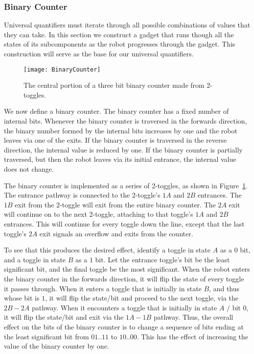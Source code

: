 \subsubsection{Binary Counter}

Universal quantifiers must iterate through all possible combinations of values that they can take. In this section we construct a gadget that runs though all the states of its subcomponents as the robot progresses through the gadget. This construction will serve as the base for our universal quantifiers.

\begin{figure}[h!]
\centering
    \texttt{[image: BinaryCounter]}
    \caption{The central portion of a three bit binary counter made from 2-toggles.}
    \label{fig:BinaryCounter}
\end{figure}
  
We now define a binary counter. The binary counter has a fixed number of internal bits.
Whenever the binary counter is traversed in the forwards direction, the binary number
formed by the internal bits increases by one and the robot leaves via one of the exits.
If the binary counter is traversed in the reverse direction, the internal value is reduced by
one. If the binary counter is partially traversed, but then the robot leaves via its initial entrance,
the internal value does not change.

The binary counter is implemented as a series of 2-toggles, as shown in Figure~\ref{fig:BinaryCounter}.
The entrance pathway is connected to the 2-toggle's $1A$ and $2B$ entrances. The $1B$ exit from the 2-toggle
will exit from the entire binary counter. The $2A$ exit will continue on to the next 2-toggle,
attaching to that toggle's $1A$ and $2B$ entrances. This will continue for every toggle down the line, except
that the last toggle's $2A$ exit signals an overflow and exits from the counter.

To see that this produces the desired effect, identify a toggle in state $A$ as a $0$ bit, and a toggle in state
$B$ as a $1$ bit. Let the entrance toggle's bit be the least significant bit, and the final toggle be the
most significant. When the robot enters the binary counter in the forwards direction, it will flip
the state of every toggle it passes through. When it enters a toggle that is initially in state $B$, and thus whose
bit is $1$, it will flip the state/bit and proceed to the next toggle, via the $2B - 2A$ pathway. When it
encounters a toggle that is initially in state $A$ / bit $0$, it will flip the state/bit and exit via the $1A - 1B$
pathway. Thus, the overall effect on the bits of the binary counter is to change a sequence of bits ending at the
least significant bit from $01..11$ to $10..00$. This has the effect of increasing the value of the binary counter
by one.

